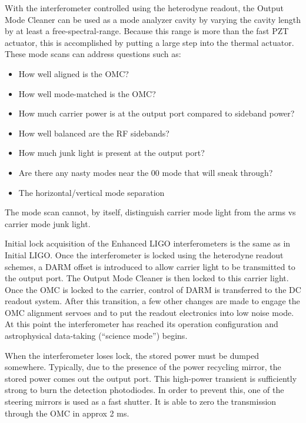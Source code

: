 With the interferometer controlled using the heterodyne readout, the
Output Mode Cleaner can be used as a mode analyzer cavity by varying
the cavity length by at least a free-spectral-range. Because this
range is more than the fast PZT actuator, this is accomplished by
putting a large step into the thermal actuator. These mode scans can
address questions such as:
\begin{itemize}
\item How well aligned is the OMC?
\item How well mode-matched is the OMC?
\item How much carrier power is at the output port compared to sideband
power?
\item How well balanced are the RF sidebands?
\item How much junk light is present at the output port?
\item Are there any nasty modes near the 00 mode that will sneak through?
\item The horizontal/vertical mode separation
\end{itemize}
The mode scan cannot, by itself, distinguish carrier mode light from
the arms vs carrier mode junk light.





Initial lock acquisition of the Enhanced LIGO interferometers is the
same as in Initial LIGO. Once the interferometer is locked using the
heterodyne readout schemes, a DARM offset is introduced to allow carrier
light to be transmitted to the output port. The Output Mode Cleaner
is then locked to this carrier light. Once the OMC is locked to the
carrier, control of DARM is transferred to the DC readout system.
After this transition, a few other changes are made to engage the
OMC alignment servoes and to put the readout electronics into low
noise mode. At this point the interferometer has reached its operation
configuration and astrophysical data-taking ({}``science mode'')
begins.



When the interferometer loses lock, the stored power must be dumped
somewhere. Typically, due to the presence of the power recycling mirror,
the stored power comes out the output port. This high-power transient
is sufficiently strong to burn the detection photodiodes. In order
to prevent this, one of the steering mirrors is used as a fast shutter.
It is able to zero the transmission through the OMC in approx 2 ms.
